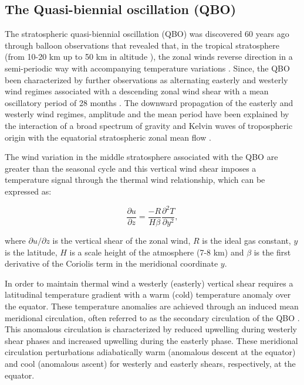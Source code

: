 \subsection{The Quasi-biennial oscillation (QBO)}

The stratospheric quasi-biennial oscillation (QBO) was discovered 60 years ago through balloon observations  that revealed that, in the tropical stratosphere (from 10-20 km up to 50 km in altitude \citep{andrews1987}), the zonal winds reverse direction in a semi-periodic way with accompanying temperature variations \citep{ebdon1960,reed1964}. Since, the QBO been characterized by further observations as alternating easterly and westerly wind regimes associated with a descending zonal wind shear with a mean oscillatory period of 28 months \citep{baldwin2001}. 
The downward propagation of the easterly and westerly wind regimes, amplitude and the mean period have been explained by the interaction of a broad spectrum of gravity and Kelvin waves of tropospheric origin with the equatorial stratospheric zonal mean flow  \citep{baldwin2001}.

The wind variation in the middle stratosphere associated with the QBO are greater than the seasonal cycle \citep{andrews1987} and this vertical wind shear imposes a temperature signal through the thermal wind relationship, which can be expressed as: 

\begin{equation}
\frac{\partial{u}}{\partial{z}}=\frac{-R}{H \beta}\frac{\partial^2 T}{\partial y^2}, 
\end{equation}

\noindent where $\partial u / \partial z$ is the vertical shear of the zonal wind, $R$ is the ideal gas constant, $y$ is the latitude, $H$ is a scale height of the atmosphere (7-8 km) and $\beta$ is the first derivative of the Coriolis term in the meridional coordinate $y$. 

In order to maintain thermal wind a westerly (easterly) vertical shear requires a latitudinal temperature gradient with a warm (cold) temperature anomaly over the equator. These temperature anomalies are achieved through an induced mean meridional circulation, often referred to as the secondary circulation of the QBO \citep{plumb1982,li1995,baldwin2001,ribera2004}. This anomalous circulation is characterized by reduced upwelling during westerly shear phases and increased upwelling during the easterly phase. These meridional circulation perturbations adiabatically warm (anomalous descent at the equator) and cool (anomalous ascent) for westerly and easterly shears, respectively, at the equator. 


